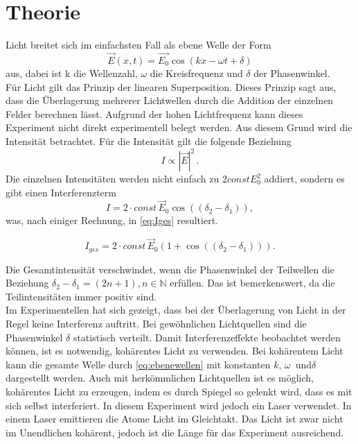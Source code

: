 \section{Theorie}
\label{sec:theorie}


Licht breitet sich im einfachsten Fall als ebene Welle der Form 
\begin{equation}
    \vec{E}(x,t) = \vec{E_0} \cos(kx - \omega t + \delta)
    \label{eq:ebenewellen}
\end{equation}
aus, dabei ist k die Wellenzahl, $\omega$ die Kreisfrequenz und $\delta$ der Phasenwinkel. \\

Für Licht gilt das Prinzip der linearen Superposition. 
Dieses Prinzip sagt aus, dass die Überlagerung mehrerer Lichtwellen durch die Addition der einzelnen Felder berechnen lässt.
Aufgrund der hohen Lichtfrequenz kann dieses Experiment nicht direkt experimentell belegt werden. Aus diesem Grund wird die Intensität betrachtet. Für die Intensität gilt die folgende Beziehung 
\begin{equation*}
    I \propto |\vec{E}|^2 \, .
\end{equation*}
Die einzelnen Intensitäten werden nicht einfach zu $2 const E_{0}^{2}$ addiert, sondern es gibt einen Interferenzterm
\begin{equation*}
    I = 2 \cdot const \, \vec{E}_0 \cos((\delta_2 - \delta_1)), 
\end{equation*}
was, nach einiger Rechnung, in \eqref{eq:Iges} resultiert.

\begin{equation}
    I_{ges} = 2 \cdot const \, \vec{E}_0 (1 + \cos((\delta_2 - \delta_1))). 
    \label{eq:Iges}
\end{equation}

Die Gesamtintensität verschwindet, wenn die Phasenwinkel der Teilwellen die Beziehung $ \delta_2 - \delta_1 = (2n + 1) , n \in \mathbb{N}$ erfüllen. 
Das ist bemerkenswert, da die Teilintensitäten immer positiv sind. \\

Im Experimentellen hat sich gezeigt, dass bei der Überlagerung von Licht in der Regel keine Interferenz auftritt. 
Bei gewöhnlichen Lichtquellen sind die Phasenwinkel $ \delta $ statistisch verteilt. 
Damit Interferenzeffekte beobachtet werden können, ist es notwendig, kohärentes Licht zu verwenden.
Bei kohärentem Licht kann die gesamte Welle durch \eqref{eq:ebenewellen} mit konstanten $k, \, \omega \, $ und$ \delta $ dargestellt werden.
Auch mit herkömmlichen Lichtquellen ist es möglich, kohärentes Licht zu erzeugen, indem es durch Spiegel so gelenkt wird, dass es mit sich selbst interferiert.
In diesem Experiment wird jedoch ein Laser verwendet. 
In einem Laser emittieren die Atome Licht im Gleichtakt. 
Das Licht ist zwar nicht im Unendlichen kohärent, jedoch ist die Länge für das Experiment ausreichend. \\


